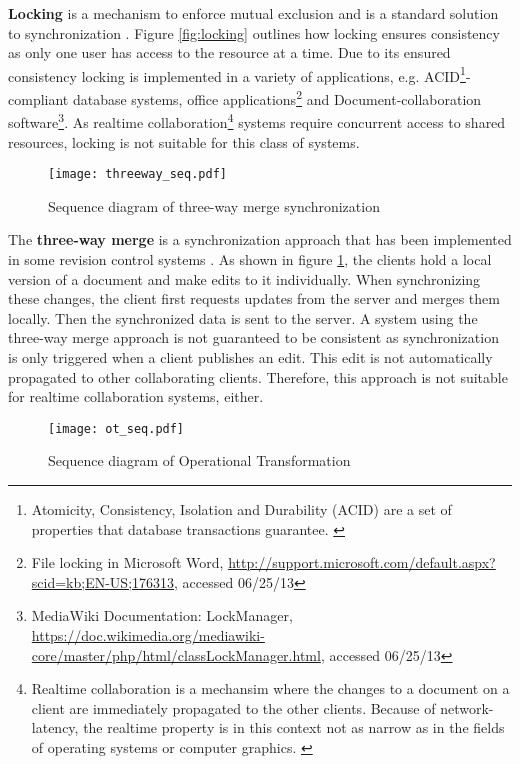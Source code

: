 \textbf{Locking} is a mechanism to enforce mutual exclusion and is a standard solution to synchronization \cite{Dijkstra_1965}. Figure \ref{fig:locking} outlines how locking ensures consistency as only one user has access to the resource at a time. Due to its ensured consistency locking is implemented in a variety of applications, e.g. ACID\footnote{Atomicity, Consistency, Isolation and Durability (ACID) are a set of properties that database transactions guarantee. \cite{Gray_1981}}-compliant database systems, office applications\footnote{File locking in Microsoft Word, \url{http://support.microsoft.com/default.aspx?scid=kb;EN-US;176313}, accessed 06/25/13} and Document-collaboration software\footnote{MediaWiki Documentation: LockManager, \url{https://doc.wikimedia.org/mediawiki-core/master/php/html/classLockManager.html}, accessed 06/25/13}. As realtime collaboration\footnote{Realtime collaboration is a mechansim where the changes to a document on a client are immediately propagated to the other clients. Because of network-latency, the realtime property is in this context not as narrow as in the fields of operating systems or computer graphics. \cite{Sun_2002}} systems require concurrent access to shared resources, locking is not suitable for this class of systems.

\begin{figure}[!h]
\begin{center}
\texttt{[image: threeway\_seq.pdf]}
\caption{Sequence diagram of three-way merge synchronization}
\label{fig:threeway}
\end{center}
\end{figure}

The \textbf{three-way merge} is a synchronization approach that has been implemented in some revision control systems \cite{Pilato_2008}. As shown in figure \ref{fig:threeway}, the clients hold a local version of a document and make edits to it individually. When synchronizing these changes, the client first requests updates from the server and merges them locally. Then the synchronized data is sent to the server. A system using the three-way merge approach is not guaranteed to be consistent as synchronization is only triggered when a client publishes an edit. This edit is not automatically propagated to other collaborating clients. Therefore, this approach is not suitable for realtime collaboration systems, either.

\begin{figure}[!h]
\begin{center}
\texttt{[image: ot\_seq.pdf]}
\caption{Sequence diagram of Operational Transformation}
\label{fig:optr}
\end{center}
\end{figure}

